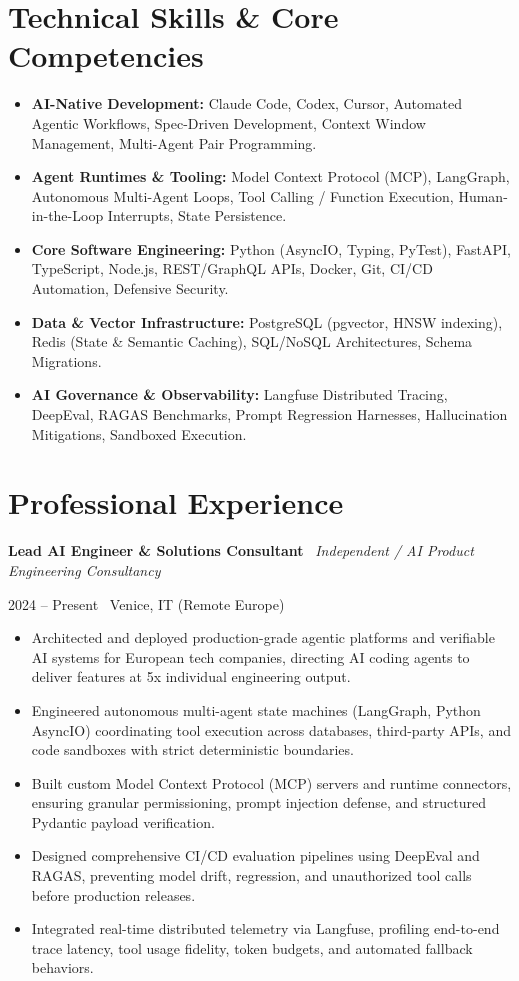 \documentclass[a4paper,10pt]{article}
\newcommand{\role}[4]{%
  \vspace{2pt}\noindent
  \begin{minipage}[t]{0.70\textwidth}\raggedright\textbf{#1} \textbullet\ \textit{#3}\end{minipage}%
  \hfill
  \begin{minipage}[t]{0.28\textwidth}\raggedleft\footnotesize\color{gray}#2 \textbullet\ #4\end{minipage}%
  \vspace{1pt}%
}
\begin{document}
\section{Technical Skills \& Core Competencies}
\begin{itemize}[leftmargin=1.2em, itemsep=2pt]
  \item \textbf{AI-Native Development:} Claude Code, Codex, Cursor, Automated Agentic Workflows, Spec-Driven Development, Context Window Management, Multi-Agent Pair Programming.
  \item \textbf{Agent Runtimes \& Tooling:} Model Context Protocol (MCP), LangGraph, Autonomous Multi-Agent Loops, Tool Calling / Function Execution, Human-in-the-Loop Interrupts, State Persistence.
  \item \textbf{Core Software Engineering:} Python (AsyncIO, Typing, PyTest), FastAPI, TypeScript, Node.js, REST/GraphQL APIs, Docker, Git, CI/CD Automation, Defensive Security.
  \item \textbf{Data \& Vector Infrastructure:} PostgreSQL (pgvector, HNSW indexing), Redis (State \& Semantic Caching), SQL/NoSQL Architectures, Schema Migrations.
  \item \textbf{AI Governance \& Observability:} Langfuse Distributed Tracing, DeepEval, RAGAS Benchmarks, Prompt Regression Harnesses, Hallucination Mitigations, Sandboxed Execution.
\end{itemize}

\section{Professional Experience}

\role{Lead AI Engineer \& Solutions Consultant}{2024 -- Present}{Independent / AI Product Engineering Consultancy}{Venice, IT (Remote Europe)}
\begin{itemize}
  \item Architected and deployed production-grade agentic platforms and verifiable AI systems for European tech companies, directing AI coding agents to deliver features at 5x individual engineering output.
  \item Engineered autonomous multi-agent state machines (LangGraph, Python AsyncIO) coordinating tool execution across databases, third-party APIs, and code sandboxes with strict deterministic boundaries.
  \item Built custom Model Context Protocol (MCP) servers and runtime connectors, ensuring granular permissioning, prompt injection defense, and structured Pydantic payload verification.
  \item Designed comprehensive CI/CD evaluation pipelines using DeepEval and RAGAS, preventing model drift, regression, and unauthorized tool calls before production releases.
  \item Integrated real-time distributed telemetry via Langfuse, profiling end-to-end trace latency, tool usage fidelity, token budgets, and automated fallback behaviors.
\end{itemize}
\end{document}
